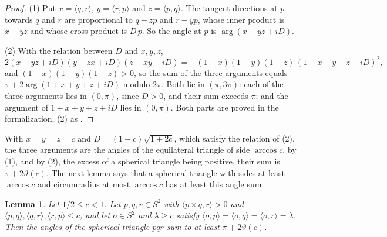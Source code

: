 \documentclass[12pt]{amsart}
\newtheorem{lemma}[theorem]{Lemma}
\theoremstyle{definition}
\theoremstyle{plain}
\theoremstyle{definition}
\newcommand{\Sph}{S^2}
\newcommand{\leanmap}[1]{\ignorespaces}
\begin{document}
\begin{proof}
(1) Put $x=\langle q,r\rangle$, $y=\langle r,p\rangle$ and $z=\langle p,q\rangle$. The tangent directions at $p$ towards $q$ and $r$ are proportional to $q-zp$ and $r-yp$, whose inner product is $x-yz$ and whose cross product is $D\,p$. So the angle at $p$ is $\arg(x-yz+iD)$.

(2) With the relation between $D$ and $x,y,z$,
\[
2(x-yz+iD)(y-zx+iD)(z-xy+iD)=-(1-x)(1-y)(1-z)\,(1+x+y+z+iD)^2 ,
\]
and $(1-x)(1-y)(1-z)>0$, so the sum of the three arguments equals $\pi+2\arg(1+x+y+z+iD)$ modulo $2\pi$. Both lie in $(\pi,3\pi)$: each of the three arguments lies in $(0,\pi)$, since $D>0$, and their sum exceeds $\pi$; and the argument of $1+x+y+z+iD$ lies in $(0,\pi)$. Both parts are proved in the formalization, (2) as .
\end{proof}

With $x=y=z=c$ and $D=(1-c)\sqrt{1+2c}$, which satisfy the relation of (2), the three arguments are the angles of the equilateral triangle of side $\arccos c$, by (1), and by (2), the excess of a spherical triangle being positive, their sum is $\pi+2\vartheta(c)$. The next lemma says that a spherical triangle with sides at least $\arccos c$ and circumradius at most $\arccos c$ has at least this angle sum.

\begin{lemma}\label{lem:fttri}\leanmap{Tammes15.FejesToth.fejesToth_triangle, Tammes15.FejesToth.gram_cross, Tammes15.FejesToth.circumcentre_identity, Tammes15.FejesToth.tri_sq_le, Tammes15.FejesToth.tri_poly, Tammes15.FejesToth.tri_mul_le, Tammes15.FejesToth.arg_le_arg_of_mul_le, Tammes15.inner_cross_cyc, Tammes15.Vendor.EM8.SquareAntiprismVerification.spherical_triangle_excess_positive}%
Let $1/2\le c<1$. Let $p,q,r\in\Sph$ with $\langle p\times q,r\rangle>0$ and $\langle p,q\rangle,\langle q,r\rangle,\langle r,p\rangle\le c$, and let $o\in\Sph$ and $\lambda\ge c$ satisfy $\langle o,p\rangle=\langle o,q\rangle=\langle o,r\rangle=\lambda$. Then the angles of the spherical triangle $pqr$ sum to at least $\pi+2\vartheta(c)$.
\end{lemma}
\end{document}
